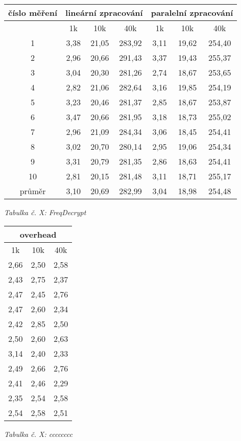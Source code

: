 \documentclass{article}
\begin{document}
\begin{center}
	\begin{tabular}{ c | c | c | c | c | c | c }
		\textbf{číslo měření} & \multicolumn{3}{c|}{\textbf{lineární zpracování}} & \multicolumn{3}{|c}{\textbf{paralelní zpracování}} \\
		\hline
		& 1k & 10k & 40k & 1k & 10k & 40k \\
		\hline
		1 & 3,38 & 21,05 & 283,92 & 3,11 & 19,62 & 254,40 \\
		\hline
		2 & 2,96 & 20,66 & 291,43 & 3,37 & 19,43 & 255,37 \\
		\hline
		3 & 3,04 & 20,30 & 281,26 & 2,74 & 18,67 & 253,65 \\
		\hline
		4 & 2,82 & 21,06 & 282,64 & 3,16 & 19,85 & 254,19 \\
		\hline
		5 & 3,23 & 20,46 & 281,37 & 2,85 & 18,67 & 253,87 \\
		\hline
		6 & 3,47 & 20,66 & 281,95 & 3,18 & 18,73 & 255,02 \\
		\hline
		7 & 2,96 & 21,09 & 284,34 & 3,06 & 18,45 & 254,41 \\
		\hline
		8 & 3,02 & 20,70 & 280,14 & 2,95 & 19,06 & 254,34 \\
		\hline
		9 & 3,31 & 20,79 & 281,35 & 2,86 & 18,63 & 254,41 \\
		\hline
		10 & 2,81 & 20,15 & 281,48 & 3,11 & 18,71 & 255,17 \\
		\hline
		průměr & 3,10 & 20,69 & 282,99 & 3,04 & 18,98 & 254,48 \\
	\end{tabular}
	\newline
	\textit{Tabulka č. X: FreqDecrypt}
\end{center}

\begin{center}
	\begin{tabular}{ c | c | c }
		\multicolumn{3}{c}{\textbf{overhead}} \\
		\hline
		1k & 10k & 40k \\
		\hline
		2,66 & 2,50 & 2,58 \\
		\hline
		2,43 & 2,75 & 2,37 \\
		\hline
		2,47 & 2,45 & 2,76 \\
		\hline
		2,47 & 2,60 & 2,34 \\
		\hline
		2,42 & 2,85 & 2,50 \\
		\hline
		2,50 & 2,60 & 2,63 \\
		\hline
		3,14 & 2,40 & 2,33 \\
		\hline
		2,49 & 2,66 & 2,76 \\
		\hline
		2,41 & 2,46 & 2,29 \\
		\hline
		2,35 & 2,54 & 2,58 \\
		\hline
		2,54 & 2,58 & 2,51 \\
	\end{tabular}
	\newline
	\textit{Tabulka č. X: cccccccc}
\end{center}
\end{document}
